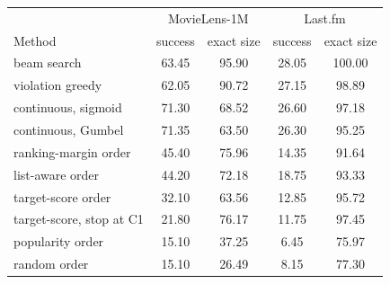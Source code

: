 \begin{tabular}{lcccc}
\toprule
 & \multicolumn{2}{c}{MovieLens-1M} & \multicolumn{2}{c}{Last.fm} \\
Method & success & exact size & success & exact size \\
\midrule
beam search & 63.45 & 95.90 & 28.05 & 100.00 \\
violation greedy & 62.05 & 90.72 & 27.15 & 98.89 \\
continuous, sigmoid & 71.30 & 68.52 & 26.60 & 97.18 \\
continuous, Gumbel & 71.35 & 63.50 & 26.30 & 95.25 \\
ranking-margin order & 45.40 & 75.96 & 14.35 & 91.64 \\
list-aware order & 44.20 & 72.18 & 18.75 & 93.33 \\
target-score order & 32.10 & 63.56 & 12.85 & 95.72 \\
target-score, stop at C1 & 21.80 & 76.17 & 11.75 & 97.45 \\
popularity order & 15.10 & 37.25 & 6.45 & 75.97 \\
random order & 15.10 & 26.49 & 8.15 & 77.30 \\
\bottomrule
\end{tabular}

